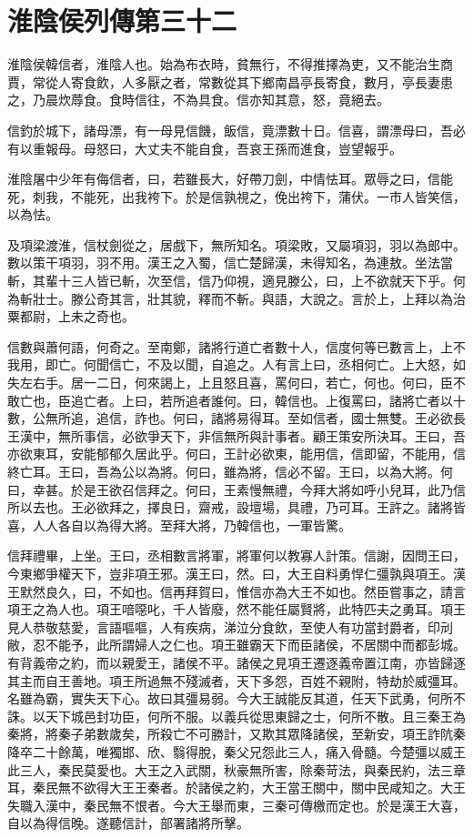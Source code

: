 \chapter{淮陰侯列傳第三十二}

淮陰侯韓信者，淮陰人也。始為布衣時，貧無行，不得推擇為吏，又不能治生商賈，常從人寄食飲，人多厭之者，常數從其下鄉南昌亭長寄食，數月，亭長妻患之，乃晨炊蓐食。食時信往，不為具食。信亦知其意，怒，竟絕去。

信釣於城下，諸母漂，有一母見信饑，飯信，竟漂數十日。信喜，謂漂母曰，吾必有以重報母。母怒曰，大丈夫不能自食，吾哀王孫而進食，豈望報乎。

淮陰屠中少年有侮信者，曰，若雖長大，好帶刀劍，中情怯耳。眾辱之曰，信能死，刺我，不能死，出我袴下。於是信孰視之，俛出袴下，蒲伏。一市人皆笑信，以為怯。

及項梁渡淮，信杖劍從之，居戲下，無所知名。項梁敗，又屬項羽，羽以為郎中。數以策干項羽，羽不用。漢王之入蜀，信亡楚歸漢，未得知名，為連敖。坐法當斬，其輩十三人皆已斬，次至信，信乃仰視，適見滕公，曰，上不欲就天下乎。何為斬壯士。滕公奇其言，壯其貌，釋而不斬。與語，大說之。言於上，上拜以為治粟都尉，上未之奇也。

信數與蕭何語，何奇之。至南鄭，諸將行道亡者數十人，信度何等已數言上，上不我用，即亡。何聞信亡，不及以聞，自追之。人有言上曰，丞相何亡。上大怒，如失左右手。居一二日，何來謁上，上且怒且喜，罵何曰，若亡，何也。何曰，臣不敢亡也，臣追亡者。上曰，若所追者誰何。曰，韓信也。上復罵曰，諸將亡者以十數，公無所追，追信，詐也。何曰，諸將易得耳。至如信者，國士無雙。王必欲長王漢中，無所事信，必欲爭天下，非信無所與計事者。顧王策安所決耳。王曰，吾亦欲東耳，安能郁郁久居此乎。何曰，王計必欲東，能用信，信即留，不能用，信終亡耳。王曰，吾為公以為將。何曰，雖為將，信必不留。王曰，以為大將。何曰，幸甚。於是王欲召信拜之。何曰，王素慢無禮，今拜大將如呼小兒耳，此乃信所以去也。王必欲拜之，擇良日，齋戒，設壇場，具禮，乃可耳。王許之。諸將皆喜，人人各自以為得大將。至拜大將，乃韓信也，一軍皆驚。

信拜禮畢，上坐。王曰，丞相數言將軍，將軍何以教寡人計策。信謝，因問王曰，今東鄉爭權天下，豈非項王邪。漢王曰，然。曰，大王自料勇悍仁彊孰與項王。漢王默然良久，曰，不如也。信再拜賀曰，惟信亦為大王不如也。然臣嘗事之，請言項王之為人也。項王喑噁叱，千人皆廢，然不能任屬賢將，此特匹夫之勇耳。項王見人恭敬慈愛，言語嘔嘔，人有疾病，涕泣分食飲，至使人有功當封爵者，印刓敝，忍不能予，此所謂婦人之仁也。項王雖霸天下而臣諸侯，不居關中而都彭城。有背義帝之約，而以親愛王，諸侯不平。諸侯之見項王遷逐義帝置江南，亦皆歸逐其主而自王善地。項王所過無不殘滅者，天下多怨，百姓不親附，特劫於威彊耳。名雖為霸，實失天下心。故曰其彊易弱。今大王誠能反其道，任天下武勇，何所不誅。以天下城邑封功臣，何所不服。以義兵從思東歸之士，何所不散。且三秦王為秦將，將秦子弟數歲矣，所殺亡不可勝計，又欺其眾降諸侯，至新安，項王詐阬秦降卒二十餘萬，唯獨邯、欣、翳得脫，秦父兄怨此三人，痛入骨髓。今楚彊以威王此三人，秦民莫愛也。大王之入武關，秋豪無所害，除秦苛法，與秦民約，法三章耳，秦民無不欲得大王王秦者。於諸侯之約，大王當王關中，關中民咸知之。大王失職入漢中，秦民無不恨者。今大王舉而東，三秦可傳檄而定也。於是漢王大喜，自以為得信晚。遂聽信計，部署諸將所擊。

